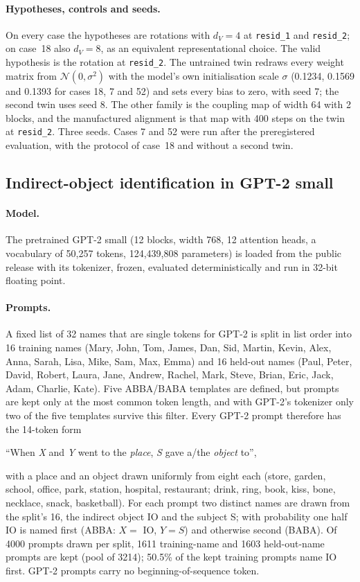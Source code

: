 \documentclass[11pt,a4paper]{article}
\newcommand{\dv}{d_V}
\begin{document}
\paragraph{Hypotheses, controls and seeds.} On every case the hypotheses are rotations with $\dv=4$ at \texttt{resid\_1} and \texttt{resid\_2}; on case~18 also $\dv=8$, as an equivalent representational choice. The valid hypothesis is the rotation at \texttt{resid\_2}. The untrained twin redraws every weight matrix from $\mathcal N(0,\sigma^2)$ with the model's own initialisation scale $\sigma$ (0.1234, 0.1569 and 0.1393 for cases 18, 7 and 52) and sets every bias to zero, with seed 7; the second twin uses seed 8. The other family is the coupling map of width 64 with 2 blocks, and the manufactured alignment is that map with 400 steps on the twin at \texttt{resid\_2}. Three seeds. Cases 7 and 52 were run after the preregistered evaluation, with the protocol of case~18 and without a second twin.

\subsection{Indirect-object identification in GPT-2 small}
\label{sec:tb:ioi}

\paragraph{Model.} The pretrained GPT-2 small \cite{radford2019} (12 blocks, width 768, 12 attention heads, a vocabulary of 50{,}257 tokens, 124{,}439{,}808 parameters) is loaded from the public release with its tokenizer, frozen, evaluated deterministically and run in 32-bit floating point.

\paragraph{Prompts.} A fixed list of 32 names that are single tokens for GPT-2 is split in list order into 16 training names (Mary, John, Tom, James, Dan, Sid, Martin, Kevin, Alex, Anna, Sarah, Lisa, Mike, Sam, Max, Emma) and 16 held-out names (Paul, Peter, David, Robert, Laura, Jane, Andrew, Rachel, Mark, Steve, Brian, Eric, Jack, Adam, Charlie, Kate). Five ABBA/BABA templates are defined, but prompts are kept only at the most common token length, and with GPT-2's tokenizer only two of the five templates survive this filter. Every GPT-2 prompt therefore has the 14-token form
\begin{center}
``When \emph{X} and \emph{Y} went to the \emph{place}, \emph{S} gave a/the \emph{object} to'',
\end{center}
with a place and an object drawn uniformly from eight each (store, garden, school, office, park, station, hospital, restaurant; drink, ring, book, kiss, bone, necklace, snack, basketball). For each prompt two distinct names are drawn from the split's 16, the indirect object IO and the subject S; with probability one half IO is named first (ABBA: $X=$ IO, $Y=S$) and otherwise second (BABA). Of 4000 prompts drawn per split, 1611 training-name and 1603 held-out-name prompts are kept (pool of 3214); 50.5\% of the kept training prompts name IO first. GPT-2 prompts carry no beginning-of-sequence token.
\end{document}
